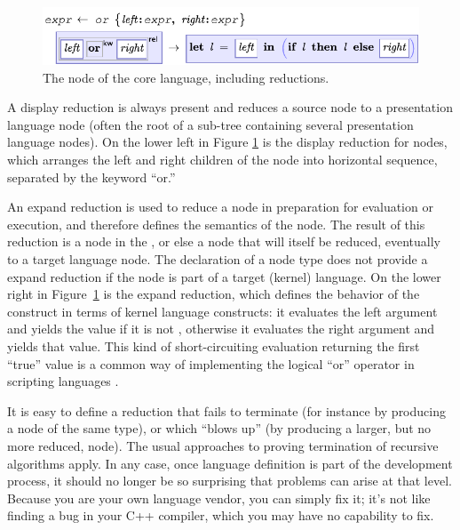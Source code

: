 \begin{figure}[t]
	\centering
	\includegraphics[scale=0.8]{src/image/and.pdf}
		
	\caption{The  node of the core language, including reductions.}
	\label{fig-and}
\end{figure}

A display reduction is always present and reduces a source node to a presentation language node (often the root of a sub-tree containing several presentation language nodes). On the lower left in Figure \ref{fig-and} is the display reduction for  nodes, which arranges the left and right children of the node into horizontal sequence, separated by the keyword ``or.''

An expand reduction is used to reduce a node in preparation for evaluation or execution, and therefore defines the semantics of the node. The result of this reduction is a node in the , or else a node that will itself be reduced, eventually to a target language node. The declaration of a node type does not provide a expand reduction if the node is part of a target (kernel) language. On the lower right in Figure~\ref{fig-and} is the expand reduction, which defines the behavior of the  construct in terms of kernel language constructs: it evaluates the left argument and yields the value if it is not , otherwise it evaluates the right argument and yields that value. This kind of short-circuiting evaluation returning the first ``true'' value is a common way of implementing the logical ``or'' operator in scripting languages \cite{javascript}\cite{clojure-and}\cite{python-and}.

It is easy to define a reduction that fails to terminate (for instance by producing a node of the same type), or which ``blows up'' (by producing a larger, but no more reduced, node). The usual approaches to proving termination of recursive algorithms apply. In any case, once language definition is part of the development process, it should no longer be so surprising that problems can arise at that level. Because you are your own language vendor, you can simply fix it; it's not like finding a bug in your C++ compiler, which you may have no capability to fix.

